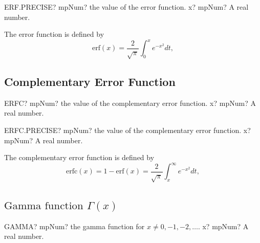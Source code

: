 \vspace{0.6cm}
\begin{mpFunctionsExtract}
	\mpWorksheetFunctionOneNotImplemented
	{ERF.PRECISE? mpNum? the value of the error function.}
	{x? mpNum? A real number.}
\end{mpFunctionsExtract}

\vspace{0.3cm}
The error function is defined by
\begin{equation}
	\text{erf}(x) = \frac{2}{\sqrt{\pi}} \int_0^x e^{-x^2} dt,
\end{equation}



\subsection{Complementary Error Function}
\label{Complementary Error Function}

\vspace{0.6cm}
\begin{mpFunctionsExtract}
	\mpWorksheetFunctionOneNotImplemented
	{ERFC? mpNum? the value of the complementary error function.}
	{x? mpNum? A real number.}
\end{mpFunctionsExtract}

\vspace{0.6cm}
\begin{mpFunctionsExtract}
	\mpWorksheetFunctionOneNotImplemented
	{ERFC.PRECISE? mpNum? the value of the complementary error function.}
	{x? mpNum? A real number.}
\end{mpFunctionsExtract}

\vspace{0.3cm}
The complementary error function is defined by
\begin{equation}
	\text{erfc}(x) = 1-\text{erf}(x) = \frac{2}{\sqrt{\pi}} \int_x^\infty e^{-x^2} dt,
\end{equation}




\subsection{\texorpdfstring{$\text{Gamma function }\Gamma(x)$}{TGamma}}
\label{GammaFunction}

\vspace{0.6cm}
\begin{mpFunctionsExtract}
	\mpWorksheetFunctionOneNotImplemented
	{GAMMA? mpNum? the gamma function for $x \neq 0, -1, -2,\ldots$.}
	{x? mpNum? A real number.}
\end{mpFunctionsExtract}

